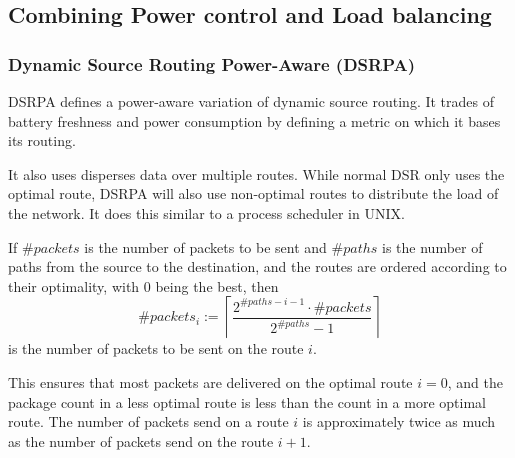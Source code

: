 \subsection{Combining Power control and Load balancing}
\subsubsection{Dynamic Source Routing Power-Aware (DSRPA)}
DSRPA\cite{djenouri2006new} defines a power-aware variation of dynamic source
routing. It trades of battery freshness and power consumption by defining a
metric on which it bases its routing.


It also uses disperses data over multiple routes.
While normal DSR only uses the optimal route,
DSRPA will also use non-optimal routes to distribute the load of the network. It
does this similar to a process scheduler in UNIX.

If $\#packets$ is the number of packets to be sent and
$\#paths$ is the number of paths from the source to the
destination, and the routes are ordered according to their optimality,
with 0 being the best, then
\[ \#packets_{i} := \left\lceil \frac{2^{\# paths - i - 1} \cdot \# packets}{2^{\#paths} - 1} \right\rceil \]
is the number of packets to be sent on the route $i$.

This ensures that most packets are delivered on the optimal route $i=0$, and
the package count in a less optimal route is less than the count in a more
optimal route. The number of packets send on a route $i$ is approximately
twice as much as the number of packets send on the route $i+1$.
